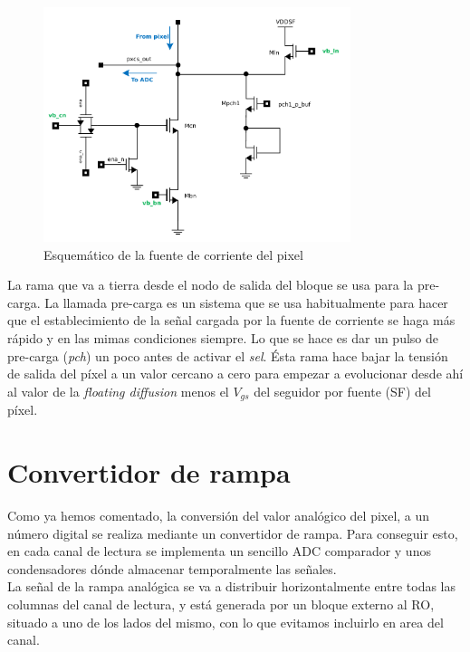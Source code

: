 \begin{figure}[h]
	\centering
	\includegraphics[width=0.8\textwidth]{svg/pxcs_sch.pdf}
	\caption{Esquemático de la fuente de corriente del pixel}
	\label{fig:pxcs_sch}
\end{figure}

La rama que va a tierra desde el nodo de salida del bloque se usa para la pre-carga.
La llamada pre-carga es un sistema que se usa habitualmente para hacer que el
establecimiento de la señal cargada por la fuente de corriente se haga más rápido
y en las mimas condiciones siempre. Lo que se hace es dar un pulso de pre-carga
(\textit{pch}) un poco antes de activar el \textit{sel}. Ésta rama hace bajar la
tensión de salida del píxel a un valor cercano a cero para empezar a evolucionar
desde ahí al valor de la \textit{floating diffusion} menos el $V_{gs}$ del seguidor
por fuente (SF) del píxel.\\

\section{Convertidor de rampa}\label{cap:ro_sch_conv}

Como ya hemos comentado, la conversión del valor analógico del pixel, a un número
digital se realiza mediante un convertidor de rampa. Para conseguir esto,
en cada canal de lectura se implementa un sencillo ADC comparador y unos condensadores
dónde almacenar temporalmente las señales.\\

La señal de la rampa analógica se va a distribuir horizontalmente entre todas las
columnas del canal de lectura, y está generada por un bloque externo al RO, situado
a uno de los lados del mismo, con lo que evitamos incluirlo en area del canal.\\

